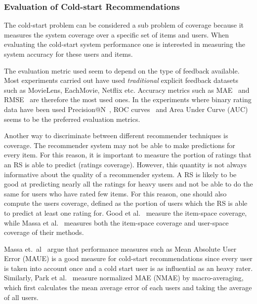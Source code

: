 
\subsubsection{Evaluation of Cold-start Recommendations}

The cold-start problem can be considered a sub problem of coverage because it
measures the system coverage over a specific set of items and users. When
evaluating the cold-start system performance one is interested in measuring the
system accuracy for these users and items.

The evaluation metric used seem to depend on the type of feedback available.
Most experiments carried out have used \emph{traditional} explicit feedback datasets such as
MovieLens, EachMovie, Netflix etc. Accuracy metrics such as MAE~\cite{Rashid2002, Rashid2008, Massa2004,
Massa2007, Stern2009} and RMSE~\cite{Agarwal2009, Agarwal2010} are therefore
the most used ones. In the experiments where binary rating data have been used
Precision@N~\cite{Liu2011, Gantner2010}, ROC curves~\cite{Agarwal2009,
Gantner2010, Schein2002} and Area Under Curve (AUC) \cite{Liu2011, Gantner2010} seems to be the
preferred evaluation metrics.

Another way to discriminate between different recommender techniques is
coverage. The recommender system may not be able to make predictions for every
item. For this reason, it is important to measure the portion of ratings that
an RS is able to predict (ratings coverage). However, this quantity is not
always informative about the quality of a recommender system. A RS is likely to
be good at predicting nearly all the ratings for heavy users and not be able to
do the same for users who have rated few items. For this reason, one should
also compute the users coverage, defined as the portion of users which the RS
is able to predict at least one rating for. Good et al.~\cite{Good1999}
measure the item-space coverage, while Massa et al.~\cite{Massa2004,
Massa2007} measures both the item-space coverage and user-space coverage of
their methods.

Massa et.\ al~\cite{Massa2004} argue that performance measures such as Mean
Absolute User Error (MAUE) is a good measure for cold-start recommendations
since every user is taken into account once and a cold start user is as
influential as an heavy rater. Similarly, Park et al.~\cite{Park2006} measure
normalized MAE (NMAE) by macro-averaging, which first calculates the mean
average error of each users and taking the average of all users.

